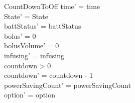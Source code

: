 \begin{schema}{CountDownToOff}
	time' = time\\ State' = State\\
	battStatus' = battStatus\\
	bolus' = 0\\
	bolusVolume' = 0\\
	infusing' = infusing\\
	countdown > 0\\
	countdown' = countdown - 1\\
	powerSavingCount' = powerSavingCount\\ option' = option\\
\end{schema}

